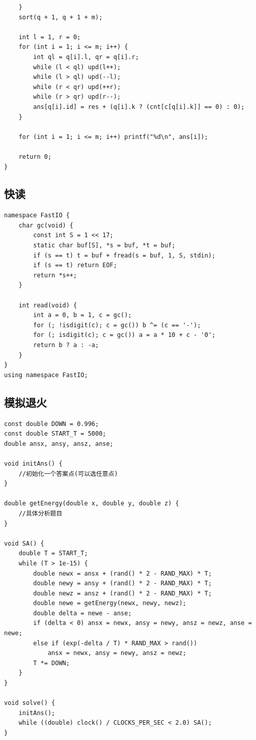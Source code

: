 \documentclass[twoside]{article}
\begin{document}
\begin{lstlisting}
    }
    sort(q + 1, q + 1 + m);

    int l = 1, r = 0;
    for (int i = 1; i <= m; i++) {
        int ql = q[i].l, qr = q[i].r;
        while (l < ql) upd(l++);
        while (l > ql) upd(--l);
        while (r < qr) upd(++r);
        while (r > qr) upd(r--);
        ans[q[i].id] = res + (q[i].k ? (cnt[c[q[i].k]] == 0) : 0);
    }

    for (int i = 1; i <= m; i++) printf("%d\n", ans[i]);

    return 0;
}
\end{lstlisting}
\subsection{快读}
\begin{lstlisting}
namespace FastIO {
    char gc(void) {
        const int S = 1 << 17;
        static char buf[S], *s = buf, *t = buf;
        if (s == t) t = buf + fread(s = buf, 1, S, stdin);
        if (s == t) return EOF;
        return *s++;
    }

    int read(void) {
        int a = 0, b = 1, c = gc();
        for (; !isdigit(c); c = gc()) b ^= (c == '-');
        for (; isdigit(c); c = gc()) a = a * 10 + c - '0';
        return b ? a : -a;
    }
}
using namespace FastIO;\end{lstlisting}
\subsection{模拟退火}
\begin{lstlisting}
const double DOWN = 0.996;
const double START_T = 5000;
double ansx, ansy, ansz, anse;

void initAns() {
    //初始化一个答案点(可以选任意点)
}

double getEnergy(double x, double y, double z) {
    //具体分析题目
}

void SA() {
    double T = START_T;
    while (T > 1e-15) {
        double newx = ansx + (rand() * 2 - RAND_MAX) * T;
        double newy = ansy + (rand() * 2 - RAND_MAX) * T;
        double newz = ansz + (rand() * 2 - RAND_MAX) * T;
        double newe = getEnergy(newx, newy, newz);
        double delta = newe - anse;
        if (delta < 0) ansx = newx, ansy = newy, ansz = newz, anse = newe;
        else if (exp(-delta / T) * RAND_MAX > rand())
            ansx = newx, ansy = newy, ansz = newz;
        T *= DOWN;
    }
}

void solve() {
    initAns();
    while ((double) clock() / CLOCKS_PER_SEC < 2.0) SA();
}

\end{lstlisting}
\end{document}
